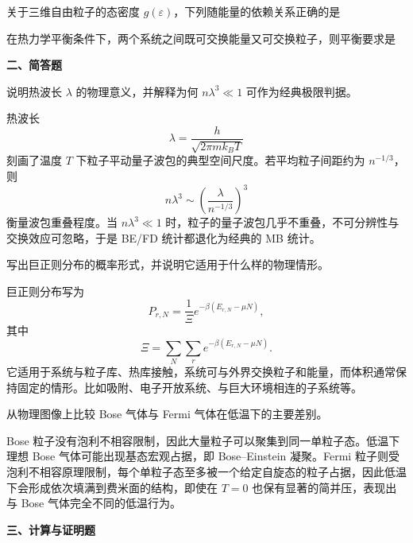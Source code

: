 \begin{question}
关于三维自由粒子的态密度 $g(\varepsilon)$，下列随能量的依赖关系正确的是
\begin{choiceoptions}[2]
\end{choiceoptions}

\begin{solution}
\end{solution}
\end{question}
\begin{question}
在热力学平衡条件下，两个系统之间既可交换能量又可交换粒子，则平衡要求是
\begin{choiceoptions}[2]
\end{choiceoptions}

\begin{solution}
\end{solution}
\end{question}
\textbf{二、简答题}

\begin{question}
说明热波长 $\lambda$ 的物理意义，并解释为何 $n\lambda^3\ll 1$ 可作为经典极限判据。

\begin{solution}
热波长
\[
\lambda=\frac{h}{\sqrt{2\pi m k_B T}}
\]
刻画了温度 $T$ 下粒子平动量子波包的典型空间尺度。若平均粒子间距约为 $n^{-1/3}$，则
\[
n\lambda^3 \sim \left(\frac{\lambda}{n^{-1/3}}\right)^3
\]
衡量波包重叠程度。当 $n\lambda^3\ll 1$ 时，粒子的量子波包几乎不重叠，不可分辨性与交换效应可忽略，于是 BE/FD 统计都退化为经典的 MB 统计。
\end{solution}
\end{question}
\begin{question}
写出巨正则分布的概率形式，并说明它适用于什么样的物理情形。

\begin{solution}
巨正则分布写为
\[
P_{r,N}=\frac{1}{\Xi}e^{-\beta(E_{r,N}-\mu N)},
\]
其中
\[
\Xi=\sum_{N}\sum_r e^{-\beta(E_{r,N}-\mu N)}.
\]
它适用于系统与粒子库、热库接触，系统可与外界交换粒子和能量，而体积通常保持固定的情形。比如吸附、电子开放系统、与巨大环境相连的子系统等。
\end{solution}
\end{question}
\begin{question}
从物理图像上比较 Bose 气体与 Fermi 气体在低温下的主要差别。

\begin{solution}
Bose 粒子没有泡利不相容限制，因此大量粒子可以聚集到同一单粒子态。低温下理想 Bose 气体可能出现基态宏观占据，即 Bose--Einstein 凝聚。Fermi 粒子则受泡利不相容原理限制，每个单粒子态至多被一个给定自旋态的粒子占据，因此低温下会形成依次填满到费米面的结构，即使在 $T=0$ 也保有显著的简并压，表现出与 Bose 气体完全不同的低温行为。
\end{solution}
\end{question}
\textbf{三、计算与证明题}

